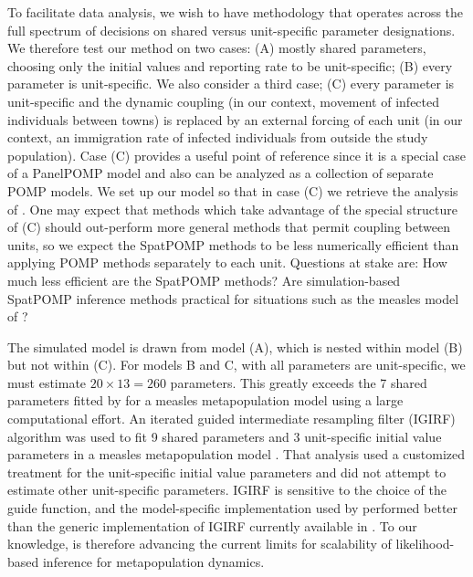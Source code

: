\documentclass[12pt]{article}\usepackage[]{graphicx}\usepackage[]{xcolor}
\begin{document}
To facilitate data analysis, we wish to have methodology that operates across the full spectrum of decisions on shared versus unit-specific parameter designations.
We therefore test our method on two cases: (A) mostly shared parameters, choosing only the initial values and reporting rate to be unit-specific; (B) every parameter is unit-specific.
We also consider a third case; (C) every parameter is unit-specific and the dynamic coupling (in our context, movement of infected individuals between towns) is replaced by an external forcing of each unit (in our context, an immigration rate of infected individuals from outside the study population).
Case (C) provides a useful point of reference since it is a special case of a PanelPOMP model \citep{breto19} and also can be analyzed as a collection of separate POMP models.
We set up our model so that in case (C) we retrieve the analysis of \citet{he10}.
One may expect that methods which take advantage of the special structure of (C) should out-perform more general methods that permit coupling between units, so we expect the SpatPOMP methods to be less numerically efficient than applying POMP methods separately to each unit.
Questions at stake are: How much less efficient are the SpatPOMP methods? Are simulation-based SpatPOMP inference methods practical for situations such as the measles model of \citet{he10}?


The simulated model is drawn from model (A), which is nested within model (B) but not within (C).
For models B and C, with all parameters are unit-specific, we must estimate $20\times 13=260$ parameters.
This greatly exceeds the 7 shared parameters fitted by \citet{ionides21} for a measles metapopulation model using a large computational effort.
An iterated guided intermediate resampling filter (IGIRF) algorithm was used to fit 9 shared parameters and 3 unit-specific initial value parameters in a measles metapopulation model \citep{park20}.
That analysis used a customized treatment for the unit-specific initial value parameters and did not attempt to estimate other unit-specific parameters.
IGIRF is sensitive to the choice of the guide function, and the model-specific implementation used by \citet{park20} performed better than the generic implementation of IGIRF currently available in .
To our knowledge, {\ibpf} is therefore advancing the current limits for scalability of likelihood-based inference for metapopulation dynamics.
\end{document}
